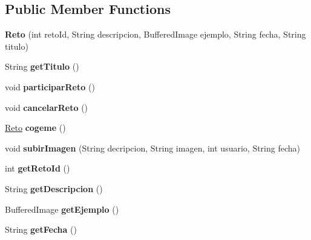 \subsection*{Public Member Functions}
\begin{DoxyCompactItemize}
\item 
\mbox{\label{classmodelo_1_1_reto_a74b04056a33a865552a5dae69527e5af}} 
{\bfseries Reto} (int reto\+Id, String descripcion, Buffered\+Image ejemplo, String fecha, String titulo)
\item 
\mbox{\label{classmodelo_1_1_reto_adb1538f92e9e9b91269c036bad2f6695}} 
String {\bfseries get\+Titulo} ()
\item 
\mbox{\label{classmodelo_1_1_reto_a86c6df368bfd3ab8c874aa35cb05f31e}} 
void {\bfseries participar\+Reto} ()
\item 
\mbox{\label{classmodelo_1_1_reto_afc1df072ba256ef71a8f24b8948ffd0c}} 
void {\bfseries cancelar\+Reto} ()
\item 
\mbox{\label{classmodelo_1_1_reto_a3ce96e348237630218cb51d36001c3dc}} 
\mbox{\hyperlink{classmodelo_1_1_reto}{Reto}} {\bfseries cogeme} ()
\item 
\mbox{\label{classmodelo_1_1_reto_ac553f503faff59b1a41934052f60f2bb}} 
void {\bfseries subir\+Imagen} (String decripcion, String imagen, int usuario, String fecha)
\item 
\mbox{\label{classmodelo_1_1_reto_a4dc82f077a5a7442ab6429f88dfb8257}} 
int {\bfseries get\+Reto\+Id} ()
\item 
\mbox{\label{classmodelo_1_1_reto_a8d693de1123ad17b8cc1d4ea7b3516d9}} 
String {\bfseries get\+Descripcion} ()
\item 
\mbox{\label{classmodelo_1_1_reto_a41fa7849d955aa7291479fabbffe841e}} 
Buffered\+Image {\bfseries get\+Ejemplo} ()
\item 
\mbox{\label{classmodelo_1_1_reto_a1c972ef5b1c0c6b22b923394a091fb06}} 
String {\bfseries get\+Fecha} ()
\end{DoxyCompactItemize}

